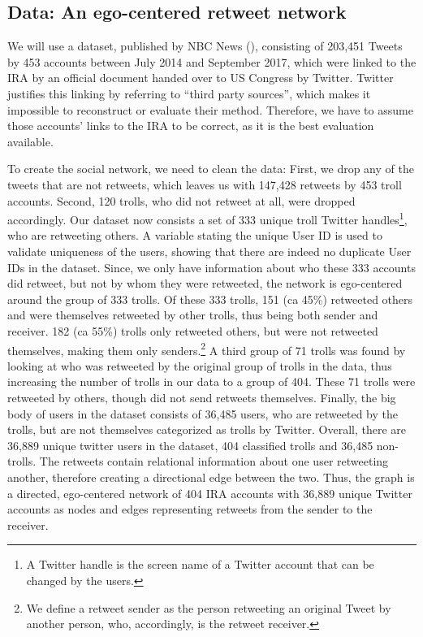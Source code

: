 \documentclass[12pt, titlepage=true, toc=bib]{scrartcl}
\begin{document}
\subsection{Data: An ego-centered retweet network}

We will use a dataset, published by NBC News (\cite*{popken_twitter_2018}), consisting of 203,451 Tweets by 453 accounts between July 2014 and September 2017, which were linked to the IRA by an official document handed over to US Congress by Twitter. Twitter justifies this linking by referring to “third party sources”, which makes it impossible to reconstruct or evaluate their method. Therefore, we have to assume those accounts’ links to the IRA to be correct, as it is the best evaluation available.

To create the social network, we need to clean the data: First, we drop any of the tweets that are not retweets, which leaves us with 147,428 retweets by 453 troll accounts. Second, 120 trolls, who did not retweet at all, were dropped accordingly. Our dataset now consists a set of 333 unique troll Twitter handles\footnote{A Twitter handle is the screen name of a Twitter account that can be changed by the users.}, who are retweeting others. A variable stating the unique User ID is used to validate uniqueness of the users, showing that there are indeed no duplicate User IDs in the dataset. Since, we only have information about who these 333 accounts did retweet, but not by whom they were retweeted, the network is ego-centered around the group of 333 trolls. Of these 333 trolls, 151 (ca 45\%) retweeted others and were themselves retweeted by other trolls, thus being both sender and receiver. 182 (ca 55\%) trolls only retweeted others, but were not retweeted themselves, making them only senders.\footnote{We define a retweet sender as the person retweeting an original Tweet by another person, who, accordingly, is the retweet receiver.} A third group of 71 trolls was found by looking at who was retweeted by the original group of trolls in the data, thus increasing the number of trolls in our data to a group of 404. These 71 trolls were retweeted by others, though did not send retweets themselves. Finally, the big body of users in the dataset consists of 36,485 users, who are retweeted by the trolls, but are not themselves categorized as trolls by Twitter. Overall, there are 36,889 unique twitter users in the dataset, 404 classified trolls and 36,485 non-trolls. The retweets contain relational information about one user retweeting another, therefore creating a directional edge between the two. Thus, the graph is a directed, ego-centered network of 404 IRA accounts with 36,889 unique Twitter accounts as nodes and edges representing retweets from the sender to the receiver.
\end{document}
